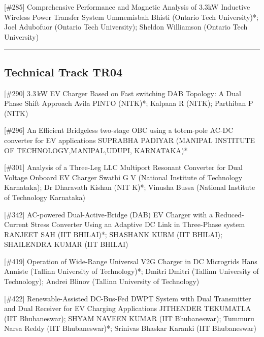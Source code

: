 {} \begin{abstract_online} {[\#285] Comprehensive Performance and Magnetic Analysis of 3.3kW Inductive Wireless Power Transfer System} {} {Ummemisbah  Bhisti (Ontario Tech University)*; Joel Adubofuor (Ontario Tech University); Sheldon Williamson (Ontario Tech University)} {}  \end{abstract_online} 
\hrule  \subsection{Technical Track TR04}\nopagebreak {} \begin{abstract_online} {[\#290] 3.3 kW EV Charger Based on Fast switching DAB Topology: A Dual Phase Shift Approach} {} {Avila PINTO (NITK)*; Kalpana R (NITK); Parthiban P (NITK)} {}  \end{abstract_online} 
{} \begin{abstract_online} {[\#296] An Efficient Bridgeless two-stage OBC using a totem-pole AC-DC converter for EV applications   } {} {SUPRABHA PADIYAR (MANIPAL INSTITUTE OF TECHNOLOGY,MANIPAL,UDUPI, KARNATAKA)*} {}  \end{abstract_online} 
{} \begin{abstract_online} {[\#301] Analysis of a Three-Leg  LLC Multiport Resonant Converter for Dual Voltage Onboard EV Charger} {} {Swathi G V (National Institute of Technology Karnataka); Dr Dharavath  Kishan (NIT K)*; Vinusha Bussa (National Institute of Technology Karnataka)} {}  \end{abstract_online} 
{} \begin{abstract_online} {[\#342] AC-powered Dual-Active-Bridge (DAB) EV Charger with a Reduced-Current Stress Converter Using an Adaptive DC Link in Three-Phase system} {} {RANJEET SAH (IIT BHILAI)*; SHASHANK KURM (IIT BHILAI); SHAILENDRA KUMAR (IIT BHILAI)} {}  \end{abstract_online} 
{} \begin{abstract_online} {[\#419] Operation of Wide-Range Universal V2G Charger in DC Microgrids} {} {Hans Anniste (Tallinn University of Technology)*; Dmitri Dmitri (Tallinn University of Technology); Andrei Blinov (Tallinn University of Technology)} {}  \end{abstract_online} 
{} \begin{abstract_online} {[\#422] Renewable-Assisted DC-Bus-Fed DWPT System with Dual Transmitter and Dual Receiver for EV Charging Applications} {} { JITHENDER  TEKUMATLA (IIT Bhubaneswar);  SHYAM  NAVEEN KUMAR (IIT Bhubaneswar); Tummuru Narsa Reddy (IIT Bhubaneswar)*; Srinivas Bhaskar Karanki (IIT Bhubaneswar)} {}  \end{abstract_online} 
